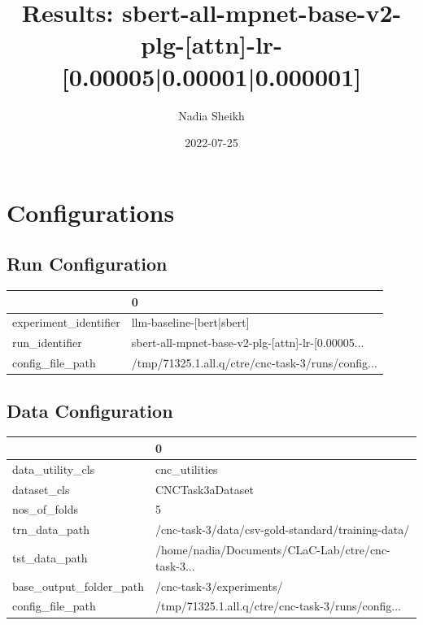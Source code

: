 \documentclass{article}
\title{Results: sbert-all-mpnet-base-v2-plg-[attn]-lr-[0.00005|0.00001|0.000001]}
\author{Nadia Sheikh}
\date{2022-07-25}
\begin{document}
\maketitle
\section{Configurations}
\subsection{Run Configuration}
\begin{tabular}{ll}
\toprule
{} &                                                  0 \\
\midrule
experiment\_identifier &                          llm-baseline-[bert|sbert] \\
run\_identifier        &  sbert-all-mpnet-base-v2-plg-[attn]-lr-[0.00005... \\
config\_file\_path      &  /tmp/71325.1.all.q/ctre/cnc-task-3/runs/config... \\
\bottomrule
\end{tabular}

\subsection{Data Configuration}
\begin{tabular}{ll}
\toprule
{} &                                                  0 \\
\midrule
data\_utility\_cls        &                                      cnc\_utilities \\
dataset\_cls             &                                   CNCTask3aDataset \\
nos\_of\_folds            &                                                  5 \\
trn\_data\_path           &  /cnc-task-3/data/csv-gold-standard/training-data/ \\
tst\_data\_path           &  /home/nadia/Documents/CLaC-Lab/ctre/cnc-task-3... \\
base\_output\_folder\_path &                           /cnc-task-3/experiments/ \\
config\_file\_path        &  /tmp/71325.1.all.q/ctre/cnc-task-3/runs/config... \\
\bottomrule
\end{tabular}
\end{document}
